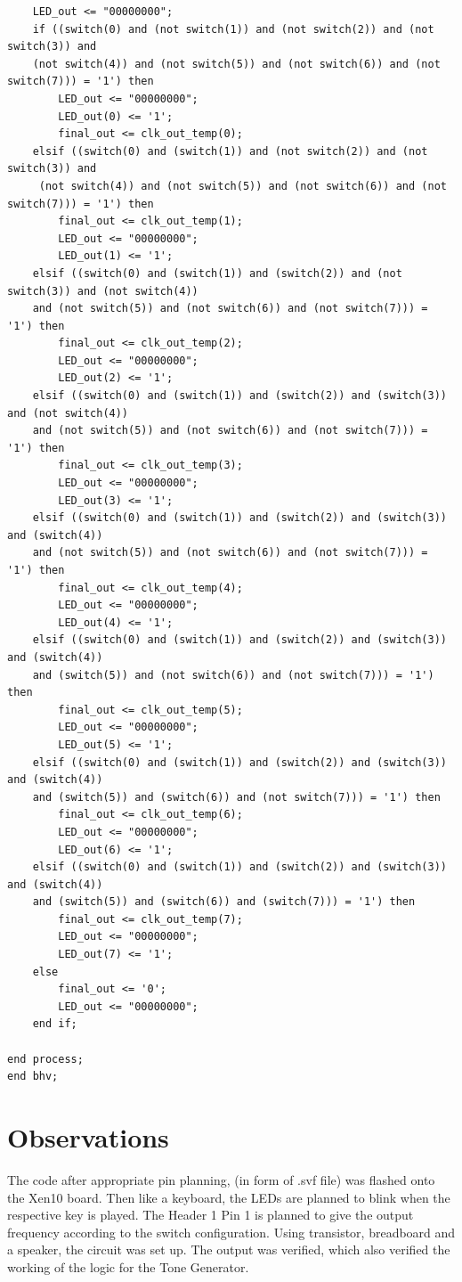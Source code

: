 \documentclass[12pt]{article}
\begin{document}
\begin{verbatim}
	LED_out <= "00000000";
	if ((switch(0) and (not switch(1)) and (not switch(2)) and (not switch(3)) and 
	(not switch(4)) and (not switch(5)) and (not switch(6)) and (not switch(7))) = '1') then
		LED_out <= "00000000";
		LED_out(0) <= '1';
		final_out <= clk_out_temp(0);
	elsif ((switch(0) and (switch(1)) and (not switch(2)) and (not switch(3)) and
	 (not switch(4)) and (not switch(5)) and (not switch(6)) and (not switch(7))) = '1') then
		final_out <= clk_out_temp(1);
		LED_out <= "00000000";
		LED_out(1) <= '1';
	elsif ((switch(0) and (switch(1)) and (switch(2)) and (not switch(3)) and (not switch(4)) 
	and (not switch(5)) and (not switch(6)) and (not switch(7))) = '1') then
		final_out <= clk_out_temp(2);
		LED_out <= "00000000";
		LED_out(2) <= '1';
	elsif ((switch(0) and (switch(1)) and (switch(2)) and (switch(3)) and (not switch(4))
	and (not switch(5)) and (not switch(6)) and (not switch(7))) = '1') then
		final_out <= clk_out_temp(3);
		LED_out <= "00000000";
		LED_out(3) <= '1';
	elsif ((switch(0) and (switch(1)) and (switch(2)) and (switch(3)) and (switch(4)) 
	and (not switch(5)) and (not switch(6)) and (not switch(7))) = '1') then
		final_out <= clk_out_temp(4);
		LED_out <= "00000000";
		LED_out(4) <= '1';
	elsif ((switch(0) and (switch(1)) and (switch(2)) and (switch(3)) and (switch(4)) 
	and (switch(5)) and (not switch(6)) and (not switch(7))) = '1') then
		final_out <= clk_out_temp(5);
		LED_out <= "00000000";
		LED_out(5) <= '1';
	elsif ((switch(0) and (switch(1)) and (switch(2)) and (switch(3)) and (switch(4)) 
	and (switch(5)) and (switch(6)) and (not switch(7))) = '1') then
		final_out <= clk_out_temp(6);
		LED_out <= "00000000";
		LED_out(6) <= '1';
	elsif ((switch(0) and (switch(1)) and (switch(2)) and (switch(3)) and (switch(4)) 
	and (switch(5)) and (switch(6)) and (switch(7))) = '1') then
		final_out <= clk_out_temp(7);
		LED_out <= "00000000";
		LED_out(7) <= '1';
	else 
		final_out <= '0';
		LED_out <= "00000000";
	end if;
	
end process;
end bhv;
\end{verbatim}

\section{Observations}
 
The code after appropriate pin planning, (in form of .svf file) was flashed onto the Xen10 board. Then like a keyboard, the LEDs are planned to blink when the respective key is played. The Header 1 Pin 1 is planned to give the output frequency according to the switch configuration. Using transistor, breadboard and a speaker, the circuit was set up. The output was verified, which also verified the working of the logic for the Tone Generator.
\end{document}
